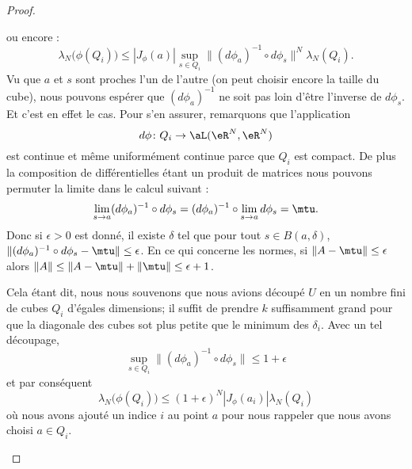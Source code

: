 \begin{proof}
\begin{enumerate}
\begin{subproof}
                ou encore :
                \begin{equation}
                    \lambda_N\big( \phi(Q_i) \big)\leq | J_{\phi}(a) |\sup_{s\in Q_i}\| (d\phi_a)^{-1}\circ d\phi_s \|^N\lambda_N(Q_i).
                \end{equation}
                Vu que \( a\) et \( s\) sont proches l'un de l'autre (on peut choisir encore la taille du cube), nous pouvons espérer que \( (d\phi_a)^{-1}\) ne soit pas loin d'être l'inverse de \( d\phi_s\). Et c'est en effet le cas. Pour s'en assurer, remarquons que l'application
                \begin{equation}
                    d\phi\colon Q_i\to \aL(\eR^N,\eR^N)
                \end{equation}
                est continue et même uniformément continue parce que \( Q_i\) est compact. De plus la composition de différentielles étant un produit de matrices nous pouvons permuter la limite dans le calcul suivant :
                \begin{equation}
                    \lim_{s\to a}(d\phi_a)^{-1}\circ d\phi_s=(d\phi_a)^{-1}\circ\lim_{s\to a}d\phi_s=\mtu.
                \end{equation}
                Donc si \( \epsilon>0\) est donné, il existe \( \delta\) tel que pour tout \( s\in B(a,\delta)\), \( \| (d\phi_a)^{-1}\circ d\phi_s-\mtu \|\leq \epsilon\). En ce qui concerne les  normes, si \( \| A-\mtu \|\leq \epsilon\) alors \( \| A \|\leq \| A-\mtu \|+\| \mtu \|\leq \epsilon+1\).

                Cela étant dit, nous nous souvenons que nous avions découpé \( U\) en un nombre fini de cubes \( Q_i\) d'égales dimensions; il suffit de prendre \( k\) suffisamment grand pour que la diagonale des cubes sot plus petite que le minimum des \( \delta_i\). Avec un tel découpage,
                \begin{equation}
                    \sup_{s\in Q_i}\| (d\phi_a)^{-1}\circ d\phi_s \|\leq 1+\epsilon
                \end{equation}
                et par conséquent
                \begin{equation}        \label{EqooQRMNooZduAkX}
                    \lambda_N\big( \phi(Q_i) \big)\leq (1+\epsilon)^N| J_{\phi}(a_i) |\lambda_N(Q_i)
                \end{equation}
                où nous avons ajouté un indice \( i\) au point \( a\) pour nous rappeler que nous avons choisi \( a\in Q_i\).


\end{subproof}
\end{enumerate}
\end{proof}
